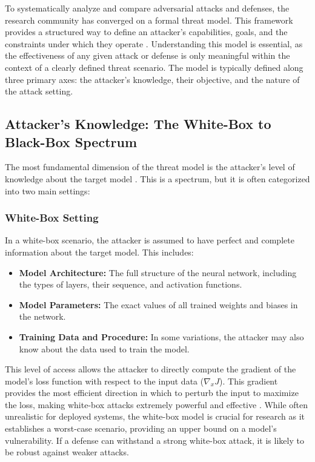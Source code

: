 \documentclass[../main.tex]{subfiles}
\begin{document}
To systematically analyze and compare adversarial attacks and defenses, the research community has converged on a formal threat model. This framework provides a structured way to define an attacker's capabilities, goals, and the constraints under which they operate \cite{carlini2017evaluatingrobustnessneuralnetworks, akhtar2018threatadversarialattacksdeep}. Understanding this model is essential, as the effectiveness of any given attack or defense is only meaningful within the context of a clearly defined threat scenario. The model is typically defined along three primary axes: the attacker's knowledge, their objective, and the nature of the attack setting.

\subsection{Attacker's Knowledge: The White-Box to Black-Box Spectrum}
The most fundamental dimension of the threat model is the attacker's level of knowledge about the target model \cite{papernot2016limitations}. This is a spectrum, but it is often categorized into two main settings:

\subsubsection{White-Box Setting}
In a white-box scenario, the attacker is assumed to have perfect and complete information about the target model. This includes:
\begin{itemize}
    \item \textbf{Model Architecture:} The full structure of the neural network, including the types of layers, their sequence, and activation functions.
    \item \textbf{Model Parameters:} The exact values of all trained weights and biases in the network.
    \item \textbf{Training Data and Procedure:} In some variations, the attacker may also know about the data used to train the model.
\end{itemize}
This level of access allows the attacker to directly compute the gradient of the model's loss function with respect to the input data ($\nabla_x J$). This gradient provides the most efficient direction in which to perturb the input to maximize the loss, making white-box attacks extremely powerful and effective \cite{goodfellow2015explaining, madry2018towardspgd}. While often unrealistic for deployed systems, the white-box model is crucial for research as it establishes a worst-case scenario, providing an upper bound on a model's vulnerability. If a defense can withstand a strong white-box attack, it is likely to be robust against weaker attacks.
\end{document}
